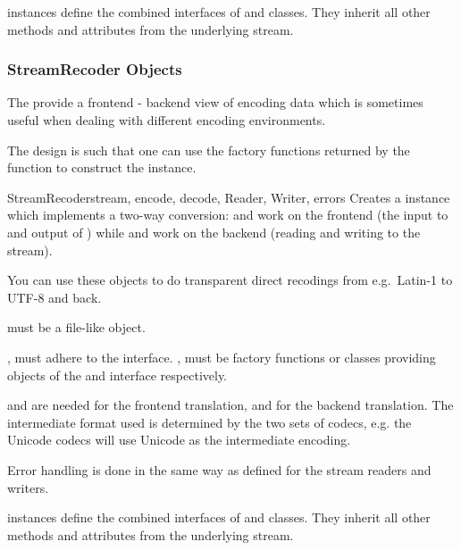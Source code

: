  instances define the combined interfaces of
 and  classes. They inherit
all other methods and attributes from the underlying stream.


\subsubsection{StreamRecoder Objects \label{stream-recoder-objects}}

The  provide a frontend - backend view of
encoding data which is sometimes useful when dealing with different
encoding environments.

The design is such that one can use the factory functions returned by
the  function to construct the instance.

\begin{classdesc}{StreamRecoder}{stream, encode, decode,
                                 Reader, Writer, errors}
  Creates a  instance which implements a two-way
  conversion:  and  work on the frontend (the
  input to  and output of ) while
   and  work on the backend (reading and
  writing to the stream).

  You can use these objects to do transparent direct recodings from
  e.g.\ Latin-1 to UTF-8 and back.

   must be a file-like object.

  ,  must adhere to the 
  interface. ,  must be factory functions or
  classes providing objects of the  and
   interface respectively.

   and  are needed for the frontend
  translation,  and  for the backend
  translation.  The intermediate format used is determined by the two
  sets of codecs, e.g. the Unicode codecs will use Unicode as the
  intermediate encoding.

  Error handling is done in the same way as defined for the
  stream readers and writers.
\end{classdesc}

 instances define the combined interfaces of
 and  classes. They inherit
all other methods and attributes from the underlying stream.

